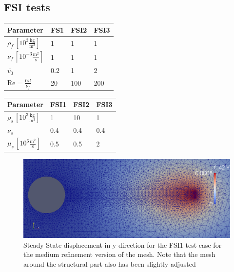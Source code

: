 \subsection{FSI tests}

\begin{table}[!ht]
\begin{center}
  \begin{tabular}{|l | l | l | l|} \hline
	Parameter & FS1 & FSI2 & FSI3 \\ \hline
    $\rho_f\, [10^3\frac{\text{kg}}{\text{m}^3}]$  & 1 & 1 & 1 \\   \hline
    $\nu_f\, [10^{-3}\frac{\text{m}^2}{\text{s}}]$ & 1 & 1 & 1 \\ \hline
    $\bar{v_0}$ & 0.2 & 1 & 2   \\ \hline \hline
    $\text{Re} = \frac{Ud}{\nu_f}$ & 20 & 100 & 200 \\ \hline
    \hline
  \end{tabular}
\end{center}
\end{table}

\begin{table}[!ht]
\begin{center}
  \begin{tabular}{|l | l | l | l|} \hline
	Parameter & FSI1 & FSI2 & FSI3 \\ \hline
    $\rho_s \,[10^3\frac{\text{kg}}{\text{m}^3}]$  & 1 & 10 & 1 \\   \hline
    $\nu_s $ & 0.4 & 0.4 & 0.4 \\ \hline
    $\mu_s \,[10^{6}\frac{\text{m}^2}{\text{s}}]$ & 0.5 & 0.5 & 2   \\ \hline \hline
  \end{tabular}
\end{center}
\end{table}
\begin{center}
\begin{figure}[!ht]
\includegraphics[width=\linewidth]{figures/FSI1_mesh_med}
\caption{Steady State displacement in y-direction for the FSI1 test case for the medium refinement version of the mesh. Note that the mesh around the structural part also has been slightly adjusted}
\end{figure}
\end{center}


